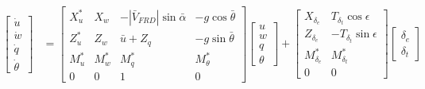 \begin{equation*}
    \begin{split}
        \begin{bmatrix}
            \dot{u} \\
            \dot{w} \\
            \dot{q} \\
            \dot{\theta}
        \end{bmatrix} & = \begin{bmatrix}
                              X_u^* & X_w   & -|\bar{V}_{FRD}|\sin\bar{\alpha} & -g\cos\bar{\theta} \\
                              Z_u^* & Z_w   & \bar{u} + Z_q                    & -g\sin\bar{\theta} \\
                              M_u^* & M_w^* & M_q^*                            & M_{\theta}^*       \\
                              0     & 0     & 1                                & 0
                          \end{bmatrix} \begin{bmatrix}
                                            u \\
                                            w \\
                                            q \\
                                            \theta
                                        \end{bmatrix} + \begin{bmatrix}
                                                            X_{\delta_e}   & T_{\delta_t}\cos\epsilon  \\
                                                            Z_{\delta_e}   & -T_{\delta_t}\sin\epsilon \\
                                                            M_{\delta_e}^* & M_{\delta_t}^*            \\
                                                            0              & 0
                                                        \end{bmatrix} \begin{bmatrix}
                                                                          \delta_e \\
                                                                          \delta_t
                                                                      \end{bmatrix}
    \end{split}
\end{equation*}

